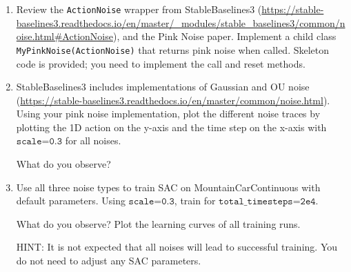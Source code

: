 \begin{enumerate}
\item Review the \texttt{ActionNoise} wrapper from StableBaselines3 ({\urlfont\url{https://stable-baselines3.readthedocs.io/en/master/_modules/stable_baselines3/common/noise.html#ActionNoise}}), and the Pink Noise paper. Implement a child class \texttt{MyPinkNoise(ActionNoise)} that returns pink noise when called. Skeleton code is provided; you need to implement the call and reset methods.

\item StableBaselines3 includes implementations of Gaussian and OU noise ({\urlfont\url{https://stable-baselines3.readthedocs.io/en/master/common/noise.html}}). Using your pink noise implementation, plot the different noise traces by plotting the 1D action on the y-axis and the time step on the x-axis with $\texttt{scale=0.3}$ for all noises.

What do you observe?

\item Use all three noise types to train SAC on MountainCarContinuous with default parameters. Using $\texttt{scale=0.3}$, train for $\texttt{total\_timesteps=2e4}$.

What do you observe? Plot the learning curves of all training runs.

HINT: It is not expected that all noises will lead to successful training. You do not need to adjust any SAC parameters.
\end{enumerate}


\ifthenelse{\isundefined{\scripthead}}{


}{}


\exerfoot
